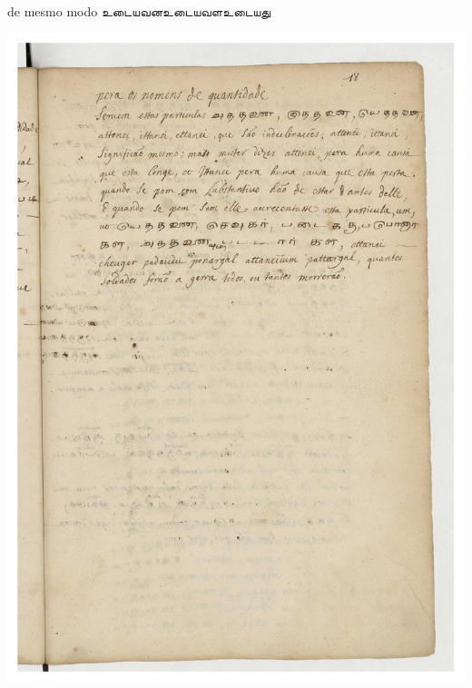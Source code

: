 \documentclass[12pt,a4paper]{scrbook}
\begin{document}
      

de mesmo modo உடையவனஉடையவளஉடையது
      
\newpage
\hypertarget{img-45}{
    \includegraphics[width=\textwidth]{img-45}}
\newpage
      
\end{document}
